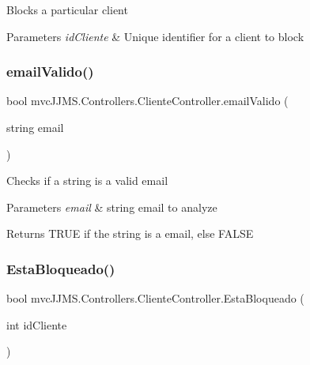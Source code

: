 Blocks a particular client 


\begin{DoxyParams}{Parameters}
{\em id\+Cliente} & Unique identifier for a client to block\\
\hline
\end{DoxyParams}
\mbox{\label{classmvc_j_j_m_s_1_1_controllers_1_1_cliente_controller_a0f8b63358a35d40ad0bdda9442d9a677}} 
\subsubsection{\texorpdfstring{email\+Valido()}{emailValido()}}
{\footnotesize\ttfamily bool mvc\+J\+J\+M\+S.\+Controllers.\+Cliente\+Controller.\+email\+Valido (\begin{DoxyParamCaption}\item[{string}]{email }\end{DoxyParamCaption})\hspace{0.3cm}{\ttfamily [inline]}}



Checks if a string is a valid email 


\begin{DoxyParams}{Parameters}
{\em email} & string email to analyze\\
\hline
\end{DoxyParams}
\begin{DoxyReturn}{Returns}
T\+R\+UE if the string is a email, else F\+A\+L\+SE
\end{DoxyReturn}
\mbox{\label{classmvc_j_j_m_s_1_1_controllers_1_1_cliente_controller_ab916e41bf8757268e95796c1cf86d3df}} 
\subsubsection{\texorpdfstring{Esta\+Bloqueado()}{EstaBloqueado()}}
{\footnotesize\ttfamily bool mvc\+J\+J\+M\+S.\+Controllers.\+Cliente\+Controller.\+Esta\+Bloqueado (\begin{DoxyParamCaption}\item[{int}]{id\+Cliente }\end{DoxyParamCaption})\hspace{0.3cm}{\ttfamily [inline]}}



